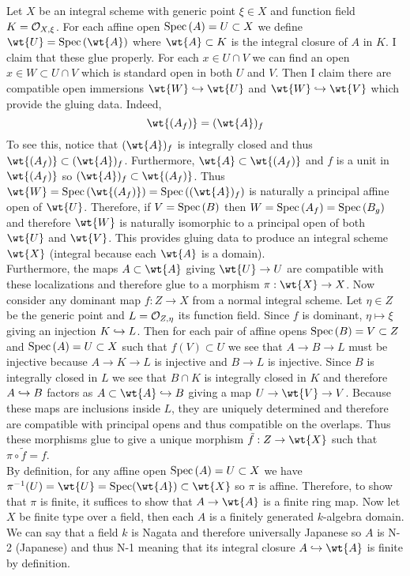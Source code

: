 \documentclass[12pt]{article}
\begin{document}
Let $X$ be an integral scheme with generic point $\xi \in X$ and function field $K = \mathcal{O}_{X, \xi}$. For each affine open $\mathrm{Spec}\left( A \right) = U \subset X$ we define $\wt{U} = \Spec{\wt{A}}$ where $\wt{A} \subset K$ is the integral closure of $A$ in $K$. I claim that these glue properly. For each $x \in U \cap V$ we can find an open $x \in W \subset U \cap V$ which is standard open in both $U$ and $V$. Then I claim there are compatible open immersions $\wt{W} \embed \wt{U}$ and $\wt{W} \embed \wt{V}$ which provide the gluing data. Indeed, 
\[ \wt{(A_f)} = (\wt{A})_f \]
To see this, notice that $(\wt{A})_f$ is integrally closed and thus $\wt{(A_f)} \subset (\wt{A})_f$. Furthermore, $\wt{A} \subset \wt{(A_f)}$ and $f$ is a unit in $\wt{(A_f)}$ so $(\wt{A})_f \subset \wt{(A_f)}$. Thus $\wt{W} = \Spec{\wt{(A_f)}} = \Spec{(\wt{A})_f}$ is naturally a principal affine open of $\wt{U}$. Therefore, if $V = \mathrm{Spec}\left( B \right)$ then $W = \mathrm{Spec}\left( A_f \right) = \mathrm{Spec}\left( B_g \right)$ and therefore $\wt{W}$ is naturally isomorphic to a principal open of both $\wt{U}$ and $\wt{V}$. This provides gluing data to produce an integral scheme $\wt{X}$ (integral because each $\wt{A}$ is a domain). 
\bigskip\\
Furthermore, the maps $A \subset \wt{A}$ giving $\wt{U} \to U$ are compatible with these localizations and therefore glue to a morphism $\pi : \wt{X} \to X$. Now consider any dominant map $f : Z \to X$ from a normal integral scheme. Let $\eta \in Z$ be the generic point and $L = \mathcal{O}_{Z, \eta}$ its function field. Since $f$ is dominant, $\eta \mapsto \xi$ giving an injection $K \hookrightarrow L$. Then for each pair of affine opens $\mathrm{Spec}\left( B \right) = V \subset Z$ and $\mathrm{Spec}\left( A \right) = U \subset X$ such that $f(V) \subset U$ we see that $A \to B \to L$ must be injective because $A \to K \to L$ is injective and $B \to L$ is injective. Since $B$ is integrally closed in $L$ we see that $B \cap K$ is integrally closed in $K$ and therefore $A \hookrightarrow B$ factors as $A \subset \wt{A} \embed B$ giving a map $U \to \wt{V} \to V$. Because these maps are inclusions inside $L$, they are uniquely determined and therefore are compatible with principal opens and thus compatible on the overlaps. Thus these morphisms glue to give a unique morphism $\tilde{f} : Z \to \wt{X}$ such that $\pi \circ \tilde{f} = f$.
\bigskip\\
By definition, for any affine open $\mathrm{Spec}\left( A \right) = U \subset X$ we have $\pi^{-1}(U) = \wt{U} = \mathrm{Spec}(\wt{A}) \subset \wt{X}$ so $\pi$ is affine. Therefore, to show that $\pi$ is finite, it suffices to show that $A \to \wt{A}$ is a finite ring map. Now let $X$ be finite type over a field, then each $A$ is a finitely generated $k$-algebra domain. We can say that a field $k$ is Nagata and therefore universally Japanese so $A$ is N-2 (Japanese) and thus N-1 meaning that its integral closure $A \embed \wt{A}$ is finite by definition. 
\end{document}
